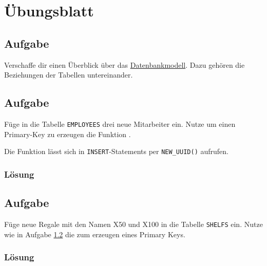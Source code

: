 \section{Übungsblatt}
\label{sec:uebung_02}

\subsection{Aufgabe}
\label{sec:uebung_02.aufgabe_01}
Verschaffe dir einen Überblick über das \hyperref[app:er-diagramm]{Datenbankmodell}. Dazu gehören die Beziehungen der Tabellen untereinander.


\subsection{Aufgabe}
\label{sec:uebung_02.aufgabe_02}
Füge in die Tabelle \texttt{EMPLOYEES} drei neue Mitarbeiter ein. Nutze um einen Primary-Key zu erzeugen die Funktion .

Die Funktion lässt sich in \texttt{INSERT}-Statements per \texttt{NEW\_UUID()} aufrufen.

\subsubsection*{Lösung}
\label{sec:uebung_02.aufgabe_02.loesung}

\subsection{Aufgabe}
\label{sec:uebung_02.aufgabe_03}
Füge neue Regale mit den Namen X50 und X100 in die Tabelle \texttt{SHELFS} ein. Nutze wie in Aufgabe \ref{sec:uebung_02.aufgabe_02} die  zum erzeugen eines Primary Keys.

\subsubsection*{Lösung}
\label{sec:uebung_02.aufgabe_03.loesung}

